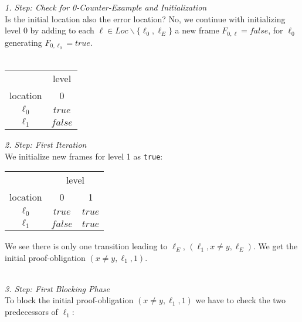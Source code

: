 \documentclass{article}
\begin{document}
	\textsl{1. Step: Check for 0-Counter-Example and Initialization} \\
	Is the initial location also the error location?
	No, we continue with initializing level 0 by adding to each $\ell \in Loc \backslash \{\ell_0, \ell_E\}$ a new frame $F_{0, \ell} = false$, for $\ell_0$ generating $F_{0, \ell_0} = true$. \\ \\
	
	
	\setlength\tabcolsep{0.35em}
	\begin{center}
		\begin{tabu}{cc}
			\toprule
			& level \\
			\cmidrule(lr){2-2}
			location & 0 \\
			$\ell_0$ & $true$ \\
			$\ell_1$ & $false$ \\
			\bottomrule
		\end{tabu}
	\end{center}
	
	\hspace*{5cm}
	
	
	\textsl{2. Step: First Iteration} \\
	We initialize new frames for level 1 as \texttt{true}: \\
	
	\begin{center}
		\begin{tabu}{ccc}
			\toprule
			& \multicolumn{2}{c}{level} \\ 
			\cmidrule(lr){2-3}
			location & 0 & 1 \\
			\cmidrule{1-3}
			$\ell_0$ & $true$ & $true$ \\
			$\ell_1$ & $false$ & $true$ \\
			\bottomrule
		\end{tabu}
	\end{center}
	
	\hspace*{5cm}
	
	
	We see there is only one transition leading to $\ell_E$, $(\ell_1, x \neq y, \ell_E)$. We get the initial proof-obligation $(x \neq y, \ell_1, 1)$. \\ \\ \par
	\textsl{3. Step: First Blocking Phase} \\
	To block the initial proof-obligation $(x \neq y, \ell_1, 1)$ we have to check the two predecessors of $\ell_1$:
	
\end{document}
